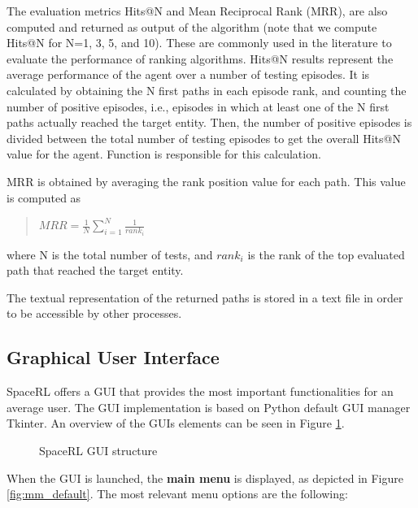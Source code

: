 The evaluation metrics Hits@N and Mean Reciprocal Rank (MRR), are also computed and returned as output of the algorithm (note that we compute Hits@N for N=1, 3, 5, and 10). These are commonly used in the literature to evaluate the performance of ranking algorithms. 
Hits@N results represent the average performance of
the agent over a number of testing episodes. It is calculated by obtaining the 
N first paths in each episode rank, and counting the number of positive episodes, i.e., episodes in which at least one of the N first paths actually reached the target entity. Then, the number of positive episodes is divided between the total number of testing episodes to get the overall Hits@N value for the agent. Function  is responsible for this calculation.

MRR is obtained by averaging the rank position value for each path. This value is computed as

\begin{quote}
 \centering
    $ MRR = \frac{1}{N} \sum_{i=1}^{N} \frac{1}{rank_i}$
\end{quote}

where N is the total number of tests, and $rank_i$ is the rank of the top evaluated path that reached the target entity.

The textual representation of the returned paths is stored in a text file in order to be accessible by other processes. 

\subsection{Graphical User Interface} \label{sec:framework-GUI}

SpaceRL offers a GUI that provides the most important functionalities for an average user. The GUI implementation is based on Python default GUI manager Tkinter. An overview of the GUIs elements can be seen in Figure \ref{fig:GUI_structure}.

\begin{figure}[!h]
    \centering
    
    \caption{SpaceRL GUI structure}
    \label{fig:GUI_structure}
\end{figure}


When the GUI is launched, the \textbf{main menu} is displayed, as depicted in Figure \ref{fig:mm_default}. The most relevant menu options are the following:

